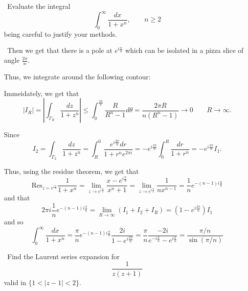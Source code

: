 \documentclass[12pt]{Homework}
\newcommand{\res}{\text{Res}}
\begin{document}
\begin{problem} $\,$
Evaluate the integral $$\int_0^\infty\frac{dx}{1+x^n},\qquad n\ge2$$ being careful to justify your methods. 
\end{problem}


\begin{solution}$\,$
Then we get that there is a pole at $e^{i\frac{\pi}{n}}$ which can be isolated in a pizza slice of angle $\frac{2\pi}{n}$.

Thus, we integrate around the following contour:
\begin{center}
\end{center}

Immeidately, we get that $$|I_R|=\left|\int_{\Gamma_R}\frac{dz}{1+z^n}\right|\le\int_0^{\frac{2\pi}{n}}\frac{R}{R^n-1}d\theta=\frac{2\pi R}{n(R^n-1)}\to0\qquad R\to\infty.$$

Since $$I_2=\int_{\Gamma_2}\frac{dz}{1+z^n}=\int_R^0\frac{e^{i\frac{2\pi}{n}}dr}{1+r^ne^{2\pi i}}=-e^{i\frac{2\pi}{n}}\int_0^R\frac{dr}{1+r^n}=-e^{i\frac{2\pi}{n}}I_1.$$

Thus, using the residue theorem, we get that $$\res_{z=e^{i\frac{\pi}{n}}}\frac{1}{1+x^n}=\lim_{z\to e^{i\frac{\pi}{n}}}\frac{x-e^{i\frac{\pi}{n}}}{x^n+1}=\lim_{z\to e^{i\frac{\pi}{n}}}\frac{1}{nx^{n-1}}=\frac{1}{n}e^{-(n-1)i\frac{\pi}{n}}$$ and that $$2\pi i\frac{1}{n}e^{-(n-1)i\frac{\pi}{n}}=\lim_{R\to\infty}(I_1+I_2+I_R)=(1-e^{i\frac{2\pi}{n}})I_1$$ and so $$\int_0^\infty\frac{dx}{1+x^n}= \frac{\pi}{n}e^{-(n-1)i\frac{\pi}{n}}\frac{2i}{1-e^{i\frac{2\pi}{n}}}=\frac{\pi}{n}\frac{-2i}{e^{-i\frac{\pi}{n}}-e^{i\frac{\pi}{n}}}=\frac{\pi/n}{\sin(\pi/n)}$$
\end{solution}
\newpage

\begin{problem} $\,$
Find the Laurent series expansion for $$\frac{1}{z(z+1)}$$ valid in $\{1<|z-1|<2\}.$
\end{problem}
\end{document}
